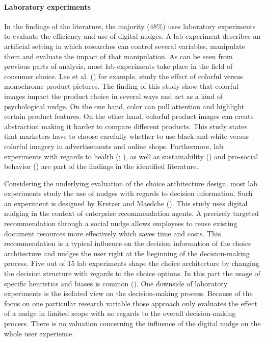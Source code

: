 \paragraph{Laboratory experiments}
In the findings of the literature, the majority (48\%) uses laboratory experiments to evaluate the efficiency and use of digital nudges. A lab experiment describes an artificial setting in which researches can control several variables, manipulate them and evaluate the impact of that manipulation. As can be seen from previous parts of analysis, most lab experiments take place in the field of consumer choice. Lee et al. (\citeyear{lee_monochrome_2014}) for example, study the effect of colorful versus monochrome product pictures. The finding of this study show that colorful images impact the product choice in several ways and act as a kind of psychological nudge.
On the one hand, color can pull attention and highlight certain product features. On the other hand, colorful product images can create abstraction making it harder to compare different products. This study states that marketers have to choose carefully whether to use black-and-white versus colorful imagery in advertisements and online shops.
Furthermore, lab experiments with regards to health (\cite{laran_nonconscious_2018}; \cite{langley_should_2015}), as well as sustainability (\cite{bruns_can_2018}) and pro-social behavior (\cite{zarghamee_nudging_2017}) are part of the findings in the identified literature. 

Considering the underlying evaluation of the choice architecture design, most lab experiments study the use of nudges with regards to decision information. Such an experiment is designed by Kretzer and Maedche (\citeyear{kretzer_designing_2018}). This study uses digital nudging in the context of enterprise recommendation agents. A precisely targeted recommendation through a social nudge allows employees to reuse existing document resources more effectively which saves time and costs. This recommendation is a typical influence on the decision information of the choice architecture and nudges the user right at the beginning of the decision-making process.  %
Five out of 15 lab experiments shape the choice architecture by changing the decision structure with regards to the choice options. In this part the usage of specific heuristics and biases is common (\cite{tversky_judgment_1974}).
One downside of laboratory experiments is the isolated view on the decision-making process. Because of the focus on one particular research variable those approach only evaluates the effect of a nudge in limited scope with no regards to the overall decision-making process. There is no valuation concerning the influence of the digital nudge on the whole user experience. %
 
